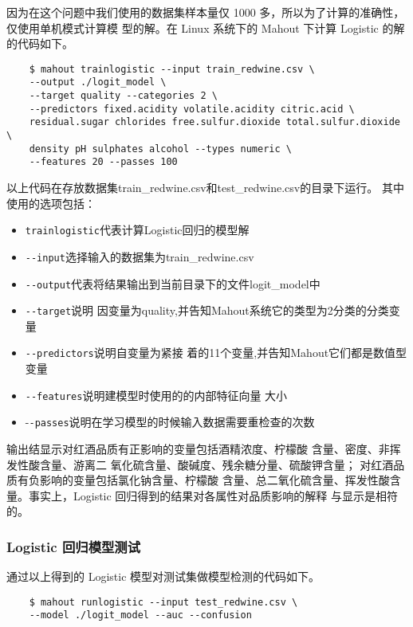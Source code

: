 因为在这个问题中我们使用的数据集样本量仅 1000
多，所以为了计算的准确性，仅使用单机模式计算模 型的解。在 Linux 系统下的
Mahout 下计算 Logistic 的解的代码如下。

\begin{lstlisting}
	$ mahout trainlogistic --input train_redwine.csv \
	--output ./logit_model \
	--target quality --categories 2 \
	--predictors fixed.acidity volatile.acidity citric.acid \
	residual.sugar chlorides free.sulfur.dioxide total.sulfur.dioxide \
	density pH sulphates alcohol --types numeric \
	--features 20 --passes 100
\end{lstlisting}

以上代码在存放数据集train\_redwine.csv和test\_redwine.csv的目录下运行。
其中使用的选项包括：

\begin{itemize}
\item
  \lstinline!trainlogistic!代表计算Logistic回归的模型解
\item
  \lstinline!--input!选择输入的数据集为train\_redwine.csv
\item
  \lstinline!--output!代表将结果输出到当前目录下的文件logit\_model中
\item
  \lstinline!--target!说明
  因变量为quality,并告知Mahout系统它的类型为2分类的分类变量
\item
  \lstinline!--predictors!说明自变量为紧接
  着的11个变量,并告知Mahout它们都是数值型变量
\item
  \lstinline!--features!说明建模型时使用的的内部特征向量 大小
\item
  -\lstinline!-passes!说明在学习模型的时候输入数据需要重检查的次数
\end{itemize}

输出结显示对红酒品质有正影响的变量包括酒精浓度、柠檬酸
含量、密度、非挥发性酸含量、游离二
氧化硫含量、酸碱度、残余糖分量、硫酸钾含量；
对红酒品质有负影响的变量包括氯化钠含量、柠檬酸
含量、总二氧化硫含量、挥发性酸含量。事实上，Logistic
回归得到的结果对各属性对品质影响的解释 与显示是相符的。

\subsubsection{Logistic
回归模型测试}\label{logistic-ux56deux5f52ux6a21ux578bux6d4bux8bd5}

通过以上得到的 Logistic 模型对测试集做模型检测的代码如下。

\begin{lstlisting}
	$ mahout runlogistic --input test_redwine.csv \
	--model ./logit_model --auc --confusion
\end{lstlisting}

